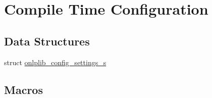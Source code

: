 \hypertarget{group__onlplib-config}{\section{Compile Time Configuration}
\label{group__onlplib-config}
}
\subsection*{Data Structures}
\begin{DoxyCompactItemize}
\item 
struct \hyperlink{structonlplib__config__settings__s}{onlplib\+\_\+config\+\_\+settings\+\_\+s}
\end{DoxyCompactItemize}
\subsection*{Macros}
